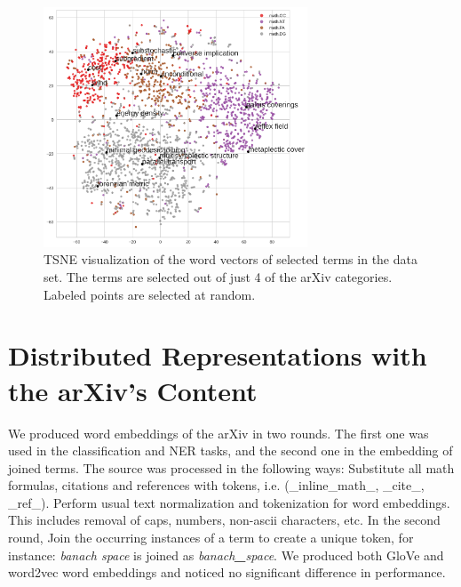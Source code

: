 \documentclass[11pt,a4paper]{article}
\begin{document}
\begin{figure}
    \centering
    \includegraphics[width=0.7\textwidth]{images/scatter_option2.png}
    \caption{\label{scatter} TSNE visualization of the word vectors
        of selected terms in the data set. The terms are selected out
        of just 4 of the arXiv categories. Labeled points are selected
    at random.}
\end{figure}
  



\section{Distributed Representations with the arXiv's Content} 
We produced word embeddings of the arXiv in two rounds. The first one
was used in the classification and NER tasks, and the second one in
the embedding of joined terms. The source was processed in the
following ways: Substitute all math formulas, citations and
references with tokens, i.e. (\_inline\_math\_, \_cite\_, \_ref\_).
 Perform usual text normalization and tokenization for word 
embeddings. This includes removal of caps, numbers, non-ascii
characters, etc. In the second round,  Join the occurring instances 
of a term to create a unique token, for instance: \emph{banach space}
is joined as \emph{banach\textbf{\_}space}.
We produced both GloVe and word2vec word
embeddings and noticed no significant difference in performance.


\end{document}
